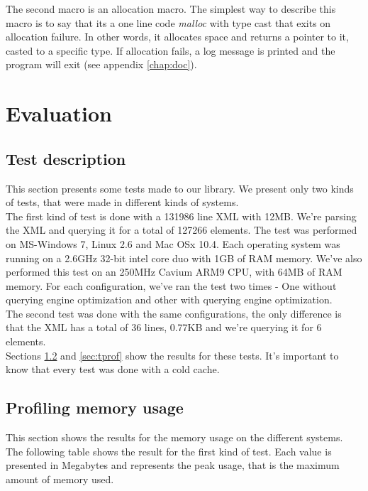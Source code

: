 \documentclass[a4paper]{report}
\begin{document}
		The second macro is an allocation macro. The simplest way to describe this macro is to say that its a one line code \emph{malloc} with type cast that exits on allocation failure. In other words, it allocates space and 
		returns a pointer to it, casted to a specific type. If allocation fails, a log message is printed and the program will exit (see appendix \ref{chap:doc}). 


\chapter{Evaluation}\label{chap:eval}

\section{Test description}\label{sec:testdesc}
	This section presents some tests made to our library. We present only two kinds of tests, that were made in different kinds of systems.\\
	
	The first kind of test is done with a 131986 line XML with 12MB. We're parsing the XML and querying it for a total of 127266 elements. The test was performed on MS-Windows 7, Linux 2.6 and Mac OSx 10.4. Each 
	operating system was running on a 2.6GHz 32-bit intel core duo with 1GB of RAM memory. We've also performed this test on an 250MHz Cavium ARM9 CPU, with 64MB of RAM memory. For each configuration, we've ran 
	the test two times - One without querying engine optimization and other with querying engine optimization. \\
	
	The second test was done with the same configurations, the only difference is that the XML has a total of 36 lines, 0.77KB and we're querying it for 6 elements.\\
	
	Sections \ref{sec:mprof} and \ref{sec:tprof} show the results for these tests. It's important to know that every test was done with a cold cache.
	
\section{Profiling memory usage}\label{sec:mprof}
	This section shows the results for the memory usage on the different systems. The following table shows the result for the first kind of test. Each value is presented in Megabytes and represents the peak usage, that is the 
	maximum amount of memory used.
	
\end{document}

